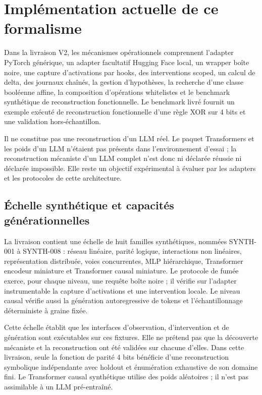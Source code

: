 \documentclass[11pt,a4paper]{article}
\begin{document}
\section{Implémentation actuelle de ce formalisme}
Dans la livraison V2, les mécanismes opérationnels comprennent l'adapter PyTorch générique, un adapter facultatif Hugging Face local, un wrapper boîte noire, une capture d'activations par hooks, des interventions scoped, un calcul de delta, des journaux chaînés, la gestion d'hypothèses, la recherche d'une classe booléenne affine, la composition d'opérations whitelistes et le benchmark synthétique de reconstruction fonctionnelle. Le benchmark livré fournit un exemple exécuté de reconstruction fonctionnelle d'une règle XOR sur 4 bits et une validation hors-échantillon.

Il ne constitue pas une reconstruction d'un LLM réel. Le paquet Transformers et les poids d'un LLM n'étaient pas présents dans l'environnement d'essai ; la reconstruction mécaniste d'un LLM complet n'est donc ni déclarée réussie ni déclarée impossible. Elle reste un objectif expérimental à évaluer par les adapters et les protocoles de cette architecture.

\subsection{Échelle synthétique et capacités générationnelles}
La livraison contient une échelle de huit familles synthétiques, nommées SYNTH-001 à SYNTH-008 : réseau linéaire, parité logique, interactions non linéaires, représentation distribuée, voies concurrentes, MLP hiérarchique, Transformer encodeur miniature et Transformer causal miniature. Le protocole de fumée exerce, pour chaque niveau, une requête boîte noire ; il vérifie sur l'adapter instrumentable la capture d'activations et une intervention locale. Le niveau causal vérifie aussi la génération autoregressive de tokens et l'échantillonnage déterministe à graine fixée.

Cette échelle établit que les interfaces d'observation, d'intervention et de génération sont exécutables sur ces fixtures. Elle ne prétend pas que la découverte mécaniste et la reconstruction ont été validées sur chacune d'elles. Dans cette livraison, seule la fonction de parité 4 bits bénéficie d'une reconstruction symbolique indépendante avec holdout et énumération exhaustive de son domaine fini. Le Transformer causal synthétique utilise des poids aléatoires ; il n'est pas assimilable à un LLM pré-entraîné.
\end{document}

